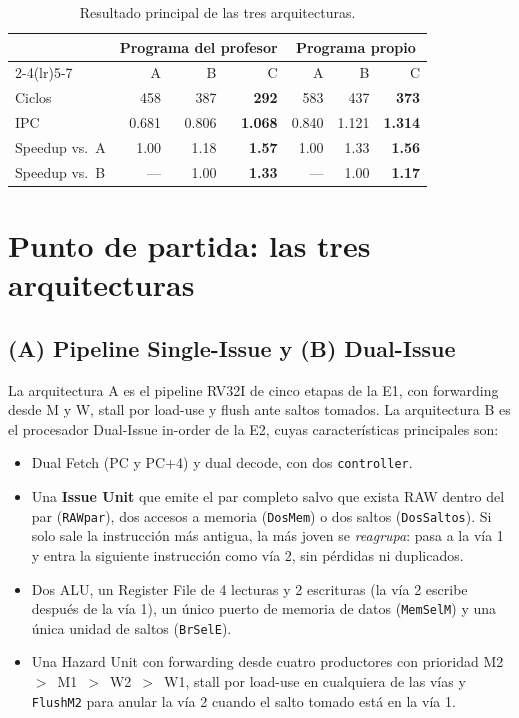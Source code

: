 \documentclass[11pt,a4paper]{article}
\newcommand{\sig}[1]{\texttt{#1}}
\begin{document}
\begin{table}[H]
\centering
\begin{tabular}{lrrrrrr}
\toprule
 & \multicolumn{3}{c}{Programa del profesor} & \multicolumn{3}{c}{Programa propio} \\
\cmidrule(lr){2-4}\cmidrule(lr){5-7}
 & A & B & C & A & B & C \\
\midrule
Ciclos & 458 & 387 & \textbf{292} & 583 & 437 & \textbf{373} \\
IPC & 0.681 & 0.806 & \textbf{1.068} & 0.840 & 1.121 & \textbf{1.314} \\
Speedup vs.\ A & 1.00 & 1.18 & \textbf{1.57} & 1.00 & 1.33 & \textbf{1.56} \\
Speedup vs.\ B & — & 1.00 & \textbf{1.33} & — & 1.00 & \textbf{1.17} \\
\bottomrule
\end{tabular}
\caption{Resultado principal de las tres arquitecturas.}
\label{tab:resumen}
\end{table}

\section{Punto de partida: las tres arquitecturas}

\subsection{(A) Pipeline Single-Issue y (B) Dual-Issue}

La arquitectura A es el pipeline RV32I de cinco etapas de la E1, con forwarding desde M y W, stall por load-use y flush ante saltos tomados. La arquitectura B es el procesador Dual-Issue in-order de la E2, cuyas características principales son:
\begin{itemize}[nosep]
  \item Dual Fetch (PC y PC+4) y dual decode, con dos \sig{controller}.
  \item Una \textbf{Issue Unit} que emite el par completo salvo que exista RAW dentro del par (\sig{RAWpar}), dos accesos a memoria (\sig{DosMem}) o dos saltos (\sig{DosSaltos}). Si solo sale la instrucción más antigua, la más joven se \emph{reagrupa}: pasa a la vía 1 y entra la siguiente instrucción como vía 2, sin pérdidas ni duplicados.
  \item Dos ALU, un Register File de 4 lecturas y 2 escrituras (la vía 2 escribe después de la vía 1), un único puerto de memoria de datos (\sig{MemSelM}) y una única unidad de saltos (\sig{BrSelE}).
  \item Una Hazard Unit con forwarding desde cuatro productores con prioridad M2~$>$~M1~$>$~W2~$>$~W1, stall por load-use en cualquiera de las vías y \sig{FlushM2} para anular la vía 2 cuando el salto tomado está en la vía 1.
\end{itemize}
\end{document}
